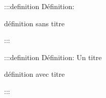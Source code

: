 \documentclass{article}
\begin{document}
:::definition Définition: 


définition sans titre


:::




:::definition Définition: Un titre


définition avec titre


:::
\end{document}
